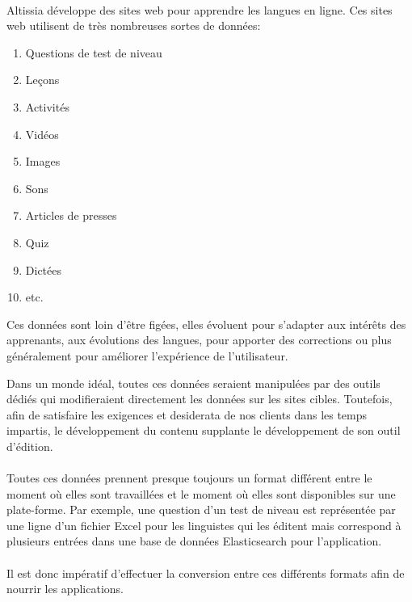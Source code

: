 \paragraph{}
Altissia développe des sites web pour apprendre les langues en ligne.
Ces sites web utilisent de très nombreuses sortes de données:
\begin{enumerate}
    \item Questions de test de niveau
    \item Leçons
    \item Activités
    \item Vidéos
    \item Images
    \item Sons
    \item Articles de presses
    \item Quiz
    \item Dictées
    \item etc.
\end{enumerate}
Ces données sont loin d'être figées, elles évoluent pour s'adapter aux intérêts des apprenants, aux évolutions des langues, pour apporter des corrections ou plus généralement pour améliorer l'expérience de l'utilisateur.

Dans un monde idéal, toutes ces données seraient manipulées par des outils dédiés qui modifieraient directement les données sur les sites cibles. Toutefois, afin de satisfaire les exigences et desiderata de nos clients dans les temps impartis, le développement du contenu supplante le développement de son outil d'édition.

\paragraph{}
Toutes ces données prennent presque toujours un format différent entre le moment où elles sont travaillées et le moment où elles sont disponibles sur une plate-forme.
Par exemple, une question d'un test de niveau est représentée par une ligne d'un fichier Excel pour les linguistes qui les éditent mais correspond à plusieurs entrées dans une base de données Elasticsearch pour l'application.

\paragraph{}
Il est donc impératif d'effectuer la conversion entre ces différents formats afin de nourrir les applications.

